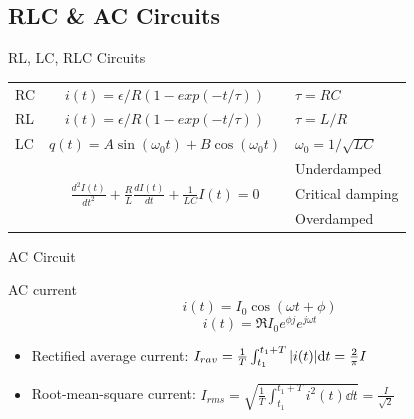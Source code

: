 \documentclass{beamer}
\begin{document}
\subsection{RLC \& AC Circuits}

\begin{frame}{RL, LC, RLC Circuits}
    \begin{table}[htbp]
        \centering
        \begin{tabular}{l c l}
            \toprule
            RC                   & $i(t)=\epsilon/R(1-exp(-t/\tau))$                                                                 & $\tau=RC$               \\ \addlinespace[1em]
            RL                   & $i(t)=\epsilon/R(1-exp(-t/\tau))$                                                                 & $\tau=L/R$              \\ \addlinespace[1em]
            LC                   & $q(t) = A\sin(\omega_0 t) + B\cos(\omega_0 t)$                                                    & $\omega_0 = 1/\sqrt{LC}$ \\ \addlinespace[1em]
            \multirow{3}{*}{RLC} & \multirow{3}{*}{$\frac{d^{2} I(t)}{d t^{2}}+\frac{R}{L} \frac{d I(t)}{d t}+\frac{1}{L C} I(t)=0$} & Underdamped             \\
                                 &                                                                                                   & Critical damping        \\
                                 &                                                                                                   & Overdamped              \\
            \bottomrule
        \end{tabular}
    \end{table}
\end{frame}


\begin{frame}{AC Circuit}
    \begin{block}{AC current}
        \begin{equation}
            i(t) = I_0 \cos(\omega t + \phi)
        \end{equation}
        \begin{equation}
            i(t) = \Re{I_0 e^{\phi j} e^{j\omega t}}
        \end{equation}
    \end{block}
    \begin{itemize}
        \item Rectified average current: $I_{rav} = \frac{1}{T}\int_{t_1}^{t_1+T}\abs{i(t)}\dd t = \frac{2}{\pi}I$
        \item Root-mean-square current: $I_{rms} = \sqrt{\frac{1}{T}\int_{t_1}^{t_1+T}i^2(t)\dd t} = \frac{I}{\sqrt{2}}$
    \end{itemize}
\end{frame}
\end{document}
